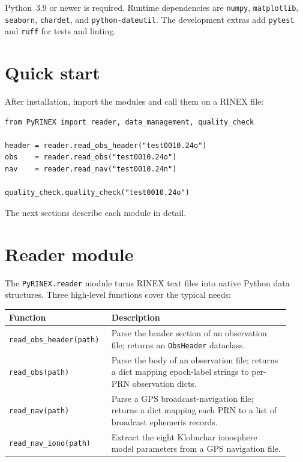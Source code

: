 \documentclass[11pt,a4paper]{article}
\begin{document}
Python~3.9 or newer is required. Runtime dependencies are
\texttt{numpy}, \texttt{matplotlib}, \texttt{seaborn},
\texttt{chardet}, and \texttt{python-dateutil}. The development
extras add \texttt{pytest} and \texttt{ruff} for tests and linting.

\section{Quick start}

After installation, import the modules and call them on a RINEX file:

\begin{lstlisting}
from PyRINEX import reader, data_management, quality_check

header = reader.read_obs_header("test0010.24o")
obs    = reader.read_obs("test0010.24o")
nav    = reader.read_nav("test0010.24n")

quality_check.quality_check("test0010.24o")
\end{lstlisting}

\noindent
The next sections describe each module in detail.

\section{Reader module}

The \texttt{PyRINEX.reader} module turns RINEX text files into native
Python data structures. Three high-level functions cover the typical
needs:

\begin{longtable}{p{0.32\linewidth}p{0.61\linewidth}}
\toprule
\textbf{Function} & \textbf{Description} \\
\midrule
\texttt{read\_obs\_header(path)} &
Parse the header section of an observation file; returns an
\texttt{ObsHeader} dataclass. \\
\addlinespace
\texttt{read\_obs(path)} &
Parse the body of an observation file; returns a dict mapping
epoch-label strings to per-PRN observation dicts. \\
\addlinespace
\texttt{read\_nav(path)} &
Parse a GPS broadcast-navigation file; returns a dict mapping
each PRN to a list of broadcast ephemeris records. \\
\addlinespace
\texttt{read\_nav\_iono(path)} &
Extract the eight Klobuchar ionosphere model parameters from a
GPS navigation file. \\
\bottomrule
\end{longtable}
\end{document}
